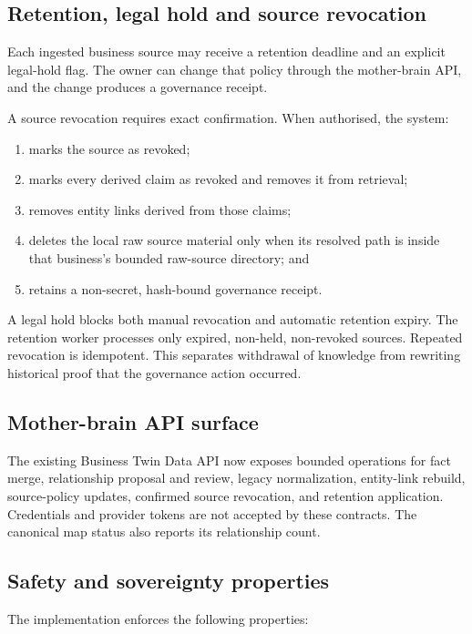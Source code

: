 \subsection{Retention, legal hold and source revocation}

Each ingested business source may receive a retention deadline and an explicit
legal-hold flag.  The owner can change that policy through the mother-brain API,
and the change produces a governance receipt.

A source revocation requires exact confirmation.  When authorised, the system:

\begin{enumerate}
  \item marks the source as revoked;
  \item marks every derived claim as revoked and removes it from retrieval;
  \item removes entity links derived from those claims;
  \item deletes the local raw source material only when its resolved path is
        inside that business's bounded raw-source directory; and
  \item retains a non-secret, hash-bound governance receipt.
\end{enumerate}

A legal hold blocks both manual revocation and automatic retention expiry.
The retention worker processes only expired, non-held, non-revoked sources.
Repeated revocation is idempotent.  This separates withdrawal of knowledge from
rewriting historical proof that the governance action occurred.

\subsection{Mother-brain API surface}

The existing Business Twin Data API now exposes bounded operations for fact
merge, relationship proposal and review, legacy normalization, entity-link
rebuild, source-policy updates, confirmed source revocation, and retention
application.  Credentials and provider tokens are not accepted by these
contracts.  The canonical map status also reports its relationship count.

\subsection{Safety and sovereignty properties}

The implementation enforces the following properties:

